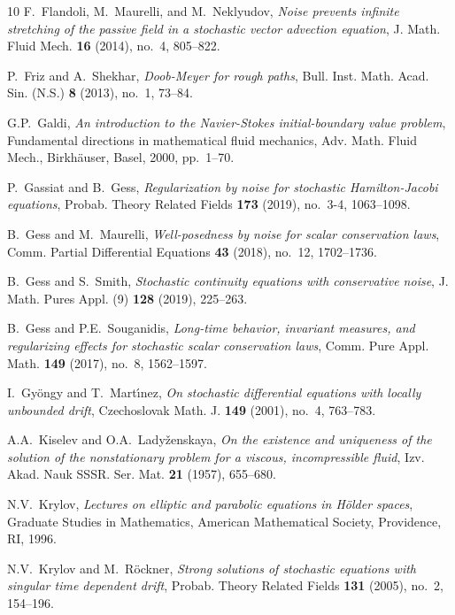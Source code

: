 \documentclass[a4paper,10pt]{article}
\newcommand\1{\mathbbm{1}}
\numberwithin{equation}{section}
\begin{document}
\begin{thebibliography}{10}
F.~Flandoli, M.~Maurelli, and M.~Neklyudov, \emph{Noise prevents infinite
  stretching of the passive field in a stochastic vector advection equation}, J. Math. Fluid Mech. \textbf{16} (2014), no.~4, 805--822.

P.~Friz and A.~Shekhar, \emph{Doob-{M}eyer for rough paths}, Bull. Inst. Math. Acad. Sin. (N.S.) \textbf{{\bf 8}} (2013), no.~1, 73--84.

G.P.~Galdi, \emph{An introduction to the {N}avier-{S}tokes initial-boundary
  value problem}, Fundamental directions in mathematical fluid mechanics, Adv. Math. Fluid Mech., Birkh\"{a}user, Basel, 2000, pp.~1--70.

P.~Gassiat and B.~Gess, \emph{Regularization by noise for stochastic
  {H}amilton-{J}acobi equations}, Probab. Theory Related Fields
  \textbf{173} (2019), no.~3-4, 1063--1098.

B.~Gess and M.~Maurelli, \emph{Well-posedness by noise for scalar conservation laws}, Comm. Partial Differential Equations \textbf{43} (2018), no.~12, 1702--1736.

B.~Gess and S.~Smith, \emph{Stochastic continuity equations with conservative noise}, J. Math. Pures Appl. (9) \textbf{128} (2019), 225--263.

B.~Gess and P.E.~Souganidis, \emph{Long-time behavior, invariant measures, and regularizing effects for stochastic scalar conservation laws}, Comm. Pure Appl. Math. \textbf{149} (2017), no.~8, 1562--1597.

I.~Gy\"{o}ngy and T.~Mart\'{\i}nez, \emph{On stochastic differential equations with locally unbounded drift}, Czechoslovak Math. J. \textbf{149} (2001), no.~4, 763--783.

A.A.~Kiselev and O.A.~Lady{\v{z}}enskaya, \emph{On the existence and
  uniqueness of the solution of the nonstationary problem for a viscous,
  incompressible fluid}, Izv. Akad. Nauk SSSR. Ser. Mat. \textbf{21}
  (1957), 655--680.

N.V.~Krylov, \emph{Lectures on elliptic and parabolic equations in {H}\"{o}lder spaces}, Graduate Studies in Mathematics, American Mathematical Society, Providence, RI, 1996.

N.V.~Krylov and M.~R{\"o}ckner, \emph{Strong solutions of stochastic equations with singular time dependent drift}, Probab. Theory Related Fields
\textbf{131} (2005), no.~2, 154--196.


\end{thebibliography}
\end{document}
